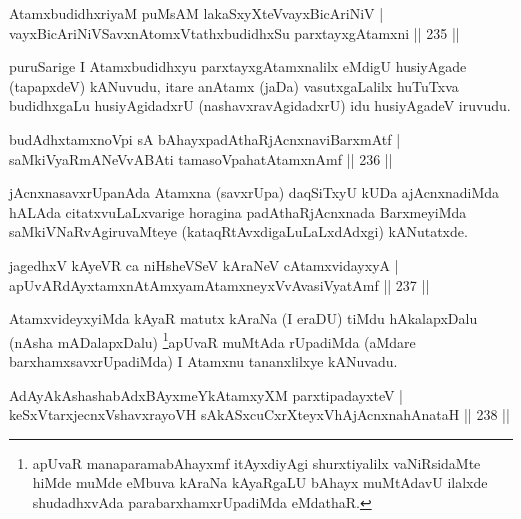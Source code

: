 
\begin{shl}
AtamxbudidhxriyaM puMsAM lakaSxyXteV\s vayxBicAriNiV |\\
vayxBicAriNiVSavxnAtomxVtathxbudidhxSu parxtayxgAtamxni \hfill || 235 ||
\end{shl}

\begin{artha}
puruSarige I Atamxbudidhxyu parxtayxgAtamxnalilx eMdigU husiyAgade (tapapxdeV) kANuvudu, itare anAtamx (jaDa) vasutxgaLalilx huTuTxva budidhxgaLu husiyAgidadxrU (nashavxravAgidadxrU) idu husiyAgadeV iruvudu.
\end{artha}


\begin{shl}
budAdhxtamxnoV\s pi sA bAhayxpadAthaRjAcnxnaviBarxmAtf |\\
saMkiVyaRmANeVvA\s \s BAti tamasoVpahatAtamxnAmf \hfill || 236 ||
\end{shl}

\begin{artha}
jAcnxnasavxrUpanAda Atamxna (savxrUpa) daqSiTxyU kUDa ajAcnxnadiMda hALAda citatxvuLaLxvarige horagina padAthaRjAcnxnada BarxmeyiMda saMkiVNaRvAgiruvaMteye (kataqRtAvxdigaLuLaLxdAdxgi) kANutatxde.
\end{artha}

\begin{shl}
jagedhxV kAyeVR ca niHsheVSeV kAraNeV cA\s \s tamxvidayxyA |\\
apUvARdAyxtamxnA\s \s tAmx\s yamAtamxneyxVvAvasiVyatAmf \hfill || 237 ||
\end{shl}

\begin{artha}
AtamxvideyxyiMda kAyaR matutx kAraNa (I eraDU) tiMdu hAkalapxDalu 
(nAsha mADalapxDalu) \footnote{apUvaR manaparamabAhayxmf itAyxdiyAgi 
shurxtiyalilx vaNiRsidaMte hiMde muMde eMbuva kAraNa kAyaRgaLU bAhayx muMtAdavU ilalxde shudadhxvAda parabarxhamxrUpadiMda eMdathaR.}apUvaR muMtAda rUpadiMda (aMdare barxhamxsavxrUpadiMda) I Atamxnu tananxlilxye kANuvadu.
\end{artha}


\begin{shl}
AdAyAkAshashabAdxBAyxmeYkAtamxyXM parxtipadayxteV |\\
keSxVtarxjecnxVshavxrayoVH sAkASxcuCxrXteyxVhAjAcnxnahAnataH \hfill || 238 ||
\end{shl}

